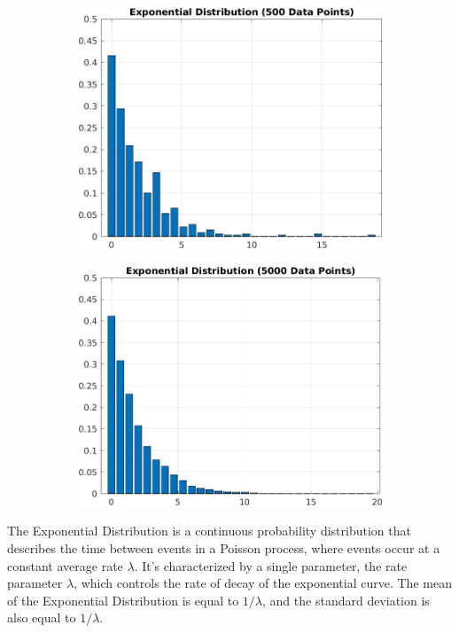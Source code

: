 \documentclass{article}
\theoremstyle{mytheoremstyle}
\theoremstyle{mytheoremstyle}
\theoremstyle{myproblemstyle}
\begin{document}
\begin{figure}[htbp]
    \begin{subfigure}[b]{0.5\textwidth}
        \includegraphics[width=\linewidth]{exp_5.png}
    \end{subfigure}
    \begin{subfigure}[b]{0.5\textwidth}
        \includegraphics[width=\linewidth]{exp_5k.png}    
    \end{subfigure}
\end{figure}

The Exponential Distribution is a continuous probability distribution that describes the time between events in a Poisson process, where events occur at a constant average rate $\lambda$. It's characterized by a single parameter, the rate parameter $\lambda$, which controls the rate of decay of the exponential curve. The mean of the Exponential Distribution is equal to $1/\lambda$, and the standard deviation is also equal to $1/\lambda$. 
\end{document}

